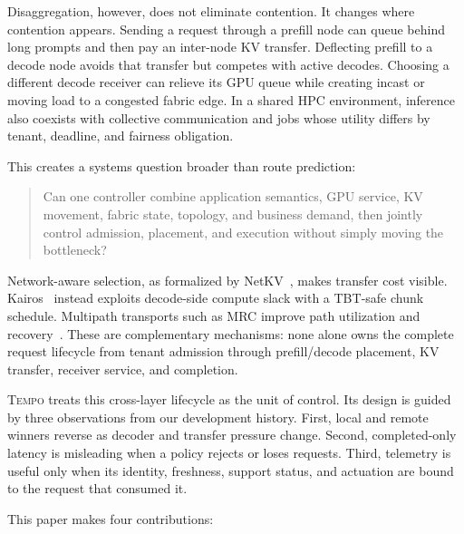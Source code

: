 \documentclass[10pt,twocolumn]{article}
\newcommand{\system}{\textsc{Tempo}\xspace}
\begin{document}
Disaggregation, however, does not eliminate contention.  It changes where
contention appears.  Sending a request through a prefill node can queue behind
long prompts and then pay an inter-node KV transfer.  Deflecting prefill to a
decode node avoids that transfer but competes with active decodes.  Choosing a
different decode receiver can relieve its GPU queue while creating incast or
moving load to a congested fabric edge.  In a shared HPC environment, inference
also coexists with collective communication and jobs whose utility differs by
tenant, deadline, and fairness obligation.

This creates a systems question broader than route prediction:

\begin{quote}
Can one controller combine application semantics, GPU service, KV movement,
fabric state, topology, and business demand, then jointly control admission,
placement, and execution without simply moving the bottleneck?
\end{quote}

Network-aware selection, as formalized by NetKV~\cite{netkv}, makes transfer
cost visible.  Kairos~\cite{kairos} instead exploits decode-side compute slack
with a TBT-safe chunk schedule.  Multipath transports such as MRC improve path
utilization and recovery~\cite{mrc}.  These are complementary mechanisms:
none alone owns the complete request lifecycle from tenant admission through
prefill/decode placement, KV transfer, receiver service, and completion.

\system treats this cross-layer lifecycle as the unit of control.  Its design
is guided by three observations from our development history.  First, local and
remote winners reverse as decoder and transfer pressure change.  Second,
completed-only latency is misleading when a policy rejects or loses requests.
Third, telemetry is useful only when its identity, freshness, support status,
and actuation are bound to the request that consumed it.

This paper makes four contributions:
\end{document}
